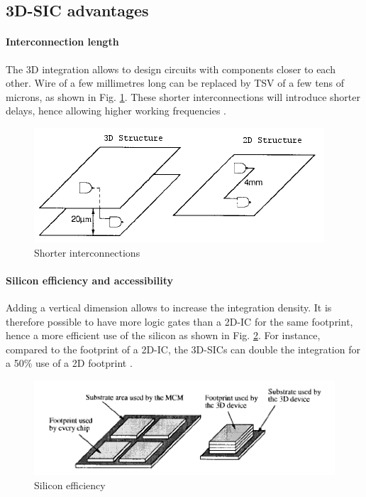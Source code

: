 \subsection{3D-SIC advantages}

\paragraph{Interconnection length}

The 3D integration allows to design circuits with components closer to each other. Wire of a few millimetres long can be replaced by TSV of a few tens of microns, as shown in Fig. \ref{fig:wire}. These shorter interconnections will introduce shorter delays, hence allowing higher working frequencies \cite{659500,981091}.

\begin{figure}[h!]
\begin{center}
\includegraphics[width=0.75\linewidth]{wire.png}
\end{center}
\vspace{-0.5cm}
\caption{Shorter interconnections \cite{659500}}
\label{fig:wire}
\end{figure}

\paragraph{Silicon efficiency and accessibility}

Adding a vertical dimension allows to increase the integration density. It is therefore possible to have more logic gates than a 2D-IC for the same footprint, hence a more efficient use of the silicon as shown in Fig. \ref{fig:footprint}. For instance, compared to the footprint of a 2D-IC, the 3D-SICs can double the integration for a 50\% use of a 2D footprint \cite{659500}.

\begin{figure}[h!]
\begin{center}
\includegraphics[width=0.75\linewidth]{footprint.png}
\end{center}
\vspace{-0.5cm}
\caption{Silicon efficiency \cite{659500}}
\label{fig:footprint}
\end{figure}

